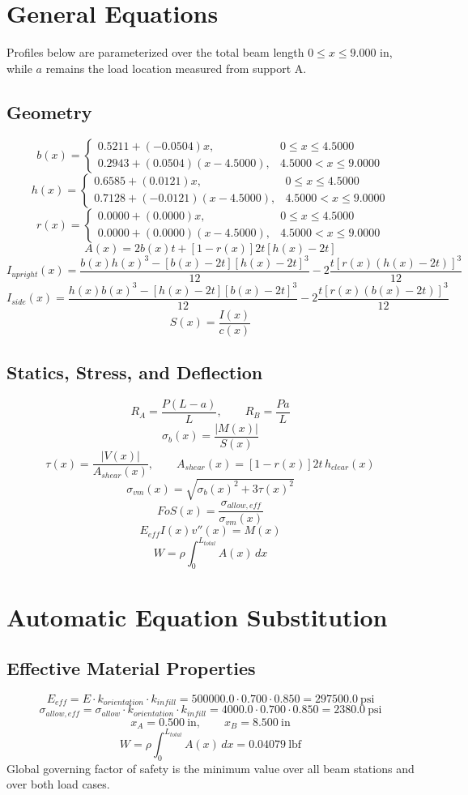 \documentclass[11pt]{article}
\begin{document}
\section*{General Equations}
Profiles below are parameterized over the total beam length $0 \le x \le 9.000$ in, while $a$ remains the load location measured from support A.
\subsection*{Geometry}
\[
b(x)=\begin{cases}0.5211 + (-0.0504)x, & 0 \le x \le 4.5000\\0.2943 + (0.0504)(x-4.5000), & 4.5000 < x \le 9.0000\end{cases}
\]
\[
h(x)=\begin{cases}0.6585 + (0.0121)x, & 0 \le x \le 4.5000\\0.7128 + (-0.0121)(x-4.5000), & 4.5000 < x \le 9.0000\end{cases}
\]
\[
r(x)=\begin{cases}0.0000 + (0.0000)x, & 0 \le x \le 4.5000\\0.0000 + (0.0000)(x-4.5000), & 4.5000 < x \le 9.0000\end{cases}
\]
\[
A(x)=2b(x)t+[1-r(x)]2t[h(x)-2t]
\]
\[
I_{upright}(x)=\frac{b(x)h(x)^3-[b(x)-2t][h(x)-2t]^3}{12}-2\frac{t[r(x)(h(x)-2t)]^3}{12}
\]
\[
I_{side}(x)=\frac{h(x)b(x)^3-[h(x)-2t][b(x)-2t]^3}{12}-2\frac{t[r(x)(b(x)-2t)]^3}{12}
\]
\[
S(x)=\frac{I(x)}{c(x)}
\]

\subsection*{Statics, Stress, and Deflection}
\[
R_A=\frac{P(L-a)}{L}, \qquad R_B=\frac{Pa}{L}
\]
\[
\sigma_b(x)=\frac{|M(x)|}{S(x)}
\]
\[
\tau(x)=\frac{|V(x)|}{A_{shear}(x)}, \qquad A_{shear}(x)=[1-r(x)]2t\,h_{clear}(x)
\]
\[
\sigma_{vm}(x)=\sqrt{\sigma_b(x)^2+3\tau(x)^2}
\]
\[
FoS(x)=\frac{\sigma_{allow,eff}}{\sigma_{vm}(x)}
\]
\[
E_{eff}I(x)v''(x)=M(x)
\]
\[
W=\rho\int_0^{L_{total}} A(x)\,dx
\]

\section*{Automatic Equation Substitution}
\subsection*{Effective Material Properties}
\[E_{eff} = E \cdot k_{orientation} \cdot k_{infill} = 500000.0 \cdot 0.700 \cdot 0.850 = 297500.0\ \mathrm{psi}\]
\[\sigma_{allow,eff} = \sigma_{allow} \cdot k_{orientation} \cdot k_{infill} = 4000.0 \cdot 0.700 \cdot 0.850 = 2380.0\ \mathrm{psi}\]
\[x_A = 0.500\ \mathrm{in}, \qquad x_B = 8.500\ \mathrm{in}\]
\[W = \rho \int_0^{L_{total}} A(x)\,dx = 0.04079\ \mathrm{lbf}\]
Global governing factor of safety is the minimum value over all beam stations and over both load cases.
\end{document}
